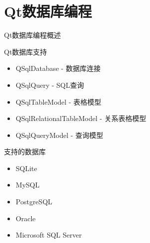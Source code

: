 \documentclass[UTF8,aspectratio=169]{beamer}
\begin{document}
\section{Qt数据库编程}

\begin{frame}{Qt数据库编程概述}
    \begin{block}{Qt数据库支持}
        \begin{itemize}
            \item QSqlDatabase - 数据库连接
            \item QSqlQuery - SQL查询
            \item QSqlTableModel - 表格模型
            \item QSqlRelationalTableModel - 关系表格模型
            \item QSqlQueryModel - 查询模型
        \end{itemize}
    \end{block}

    \begin{block}{支持的数据库}
        \begin{itemize}
            \item SQLite
            \item MySQL
            \item PostgreSQL
            \item Oracle
            \item Microsoft SQL Server
        \end{itemize}
    \end{block}
\end{frame}
\end{document}
